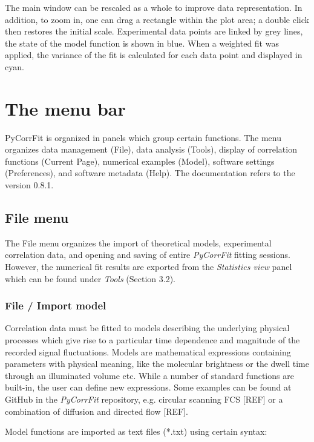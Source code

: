 The main window can be rescaled as a whole to improve data representation. In addition, to zoom in, one can drag a rectangle within the plot area; a double click then restores the initial scale. Experimental data points are linked by grey lines, the state of the model function is shown in blue. When a weighted fit was applied, the variance of the fit is calculated for each data point and displayed in cyan.

\section{The menu bar}

PyCorrFit is organized in panels which group certain functions. The menu organizes data management (File), data analysis (Tools), display of correlation functions (Current Page), numerical examples (Model), software settings (Preferences), and software metadata (Help). The documentation refers to the version 0.8.1.

\subsection{File menu}

The File menu organizes the import of theoretical models, experimental correlation data, and opening and saving of entire \textit{PyCorrFit} fitting sessions. However, the numerical fit results are exported from the \textit{Statistics view} panel which can be found under \textit{Tools} (Section 3.2).

\subsubsection{File / Import model}

Correlation data must be fitted to models describing the underlying physical processes which give rise to a particular time dependence and magnitude of the recorded signal fluctuations. Models are mathematical expressions containing parameters with physical meaning, like the molecular brightness or the dwell time through an illuminated volume etc. While a number of standard functions are built-in, the user can define new expressions. Some examples can be found at GitHub in the \textit{PyCorrFit} repository, e.g. circular scanning FCS [REF] or a combination of diffusion and directed flow [REF].

Model functions are imported as text files (*.txt) using certain syntax:

